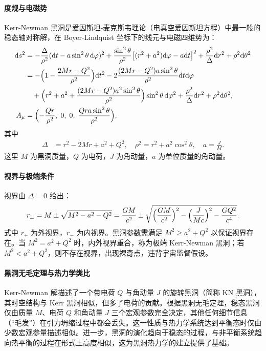 \paragraph{度规与电磁势}
Kerr-Newman 黑洞是爱因斯坦-麦克斯韦理论（电真空爱因斯坦方程）中最一般的稳态轴对称解，在 Boyer-Lindquist 坐标下的线元与电磁四维势为：
\begin{align}
\mathrm{d}s^{2} &= -\frac{\Delta}{\rho^{2}}(\mathrm{d}t - a\sin^{2}\theta \, \mathrm{d}\varphi)^{2} 
+ \frac{\sin^{2}\theta}{\rho^{2}}\bigl[(r^{2}+a^{2})\mathrm{d}\varphi - a\mathrm{d}t\bigr]^{2} 
+ \frac{\rho^{2}}{\Delta}\mathrm{d}r^{2} + \rho^{2}\mathrm{d}\theta^{2} \label{eq:kn_metric1} \\
&= -\Bigl(1-\frac{2Mr-Q^{2}}{\rho^{2}}\Bigr) \mathrm{d}t^{2}
- 2\frac{(2Mr-Q^{2})a\sin^{2}\theta}{\rho^{2}} \mathrm{d}t\mathrm{d}\varphi \notag \\
&\quad + \Bigl(r^{2}+a^{2}+\frac{(2Mr-Q^{2})a^{2}\sin^{2}\theta}{\rho^{2}}\Bigr) \sin^{2}\theta \, \mathrm{d}\varphi^{2}
+ \frac{\rho^{2}}{\Delta}\mathrm{d}r^{2} + \rho^{2}\mathrm{d}\theta^{2}, \label{eq:kn_metric2} \\
A_{\mu} &= \Bigl(-\frac{Qr}{\rho^{2}},\; 0,\; 0,\; \frac{Qr a\sin^{2}\theta}{\rho^{2}}\Bigr), \label{eq:kn_potential}
\end{align}
其中
\begin{align}
\Delta &= r^{2} - 2Mr + a^{2} + Q^{2}, \quad 
\rho^{2} = r^{2} + a^{2}\cos^{2}\theta, \quad
a = \frac{J}{M}.
\end{align}
这里 $M$ 为黑洞质量，$Q$ 为电荷，$J$ 为角动量，$a$ 为单位质量的角动量。

\paragraph{视界与极端条件}
视界由 $\Delta=0$ 给出：
\begin{align}
r_{\pm} = M \pm \sqrt{M^{2} - a^{2} - Q^{2}}
        = \frac{GM}{c^{2}} \pm \sqrt{\Bigl(\frac{GM}{c^{2}}\Bigr)^{2} 
        - \Bigl(\frac{J}{Mc}\Bigr)^{2} - \frac{GQ^{2}}{c^{4}} } .
\end{align}
式中 $r_{+}$ 为外视界，$r_{-}$ 为内视界。黑洞参数需满足 $M^{2} \geq a^{2} + Q^{2}$ 以保证视界存在。当 $M^{2} = a^{2} + Q^{2}$ 时，内外视界重合，称为极端 Kerr-Newman 黑洞；若 $M^{2} < a^{2} + Q^{2}$，则不存在视界，出现裸奇点，违背宇宙监督假设。

\paragraph{黑洞无毛定理与热力学类比}
Kerr-Newman 解描述了一个带电荷 $Q$ 与角动量 $J$ 的旋转黑洞（简称 KN 黑洞），其时空结构与 Kerr 黑洞相似，但多了电荷的贡献。根据黑洞无毛定理，稳态黑洞仅由质量 $M$、电荷 $Q$ 和角动量 $J$ 三个宏观参数完全决定，其他任何细节信息（“毛发”）在引力坍缩过程中都会丢失。这一性质与热力学系统达到平衡态时仅由少数宏观参量描述相似。进一步，黑洞的演化趋向于稳态的过程，与非平衡系统趋向热平衡的过程在形式上高度相似，这为黑洞热力学的建立提供了基础。

